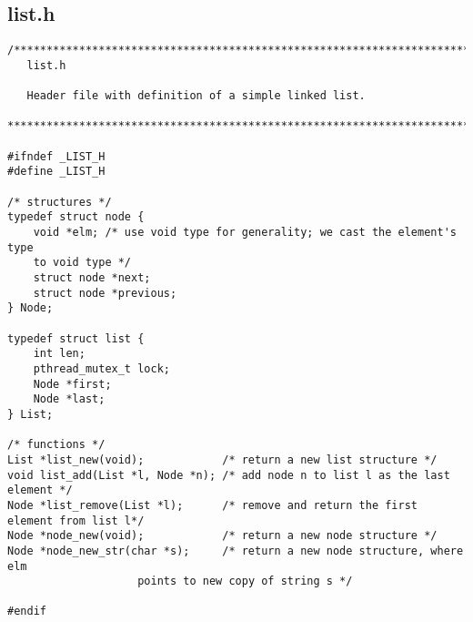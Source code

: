 \subsection{list.h}
\begin{lstlisting}
/******************************************************************************
   list.h 

   Header file with definition of a simple linked list.

******************************************************************************/

#ifndef _LIST_H
#define _LIST_H

/* structures */
typedef struct node {
	void *elm; /* use void type for generality; we cast the element's type 
	to void type */
	struct node *next;
	struct node *previous;
} Node;

typedef struct list {
	int len;
	pthread_mutex_t lock;
	Node *first;
	Node *last;
} List;

/* functions */
List *list_new(void);            /* return a new list structure */
void list_add(List *l, Node *n); /* add node n to list l as the last element */
Node *list_remove(List *l);      /* remove and return the first element from list l*/
Node *node_new(void);            /* return a new node structure */
Node *node_new_str(char *s);     /* return a new node structure, where elm 
					points to new copy of string s */

#endif
\end{lstlisting}